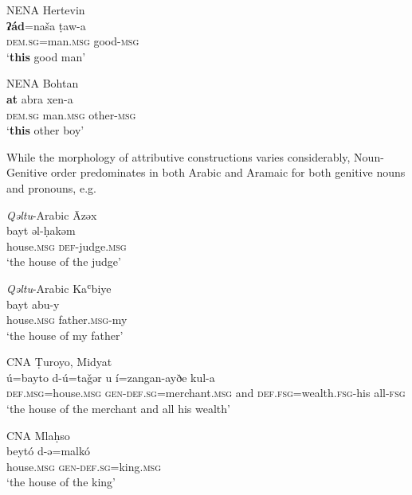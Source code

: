 \documentclass[output=paper,colorlinks,citecolor=brown,draftmode]{langscibook}
\begin{document}
\ea\label{Arabic:ex:8}
NENA Hertevin \citep{Jastrow1988NAHertevin}\\
\gll \textbf{ʔád}=naša ṭaw-a \\
     \textsc{dem.sg=}man\textsc{.msg} good\textsc{-msg} \\
\glt `\textbf{this} good man' 
\z

\ea\label{Arabic:ex:9}
NENA Bohtan \citep[122.§87]{Fox2009NABohtan}\\
\gll \textbf{at} abra xen-a \\
     \textsc{dem.sg} man\textsc{.msg} other\textsc{-msg} \\
\glt `\textbf{this} other boy'
\z


While the morphology of attributive constructions varies considerably, Noun-Genitive order predominates in both Arabic and Aramaic for both genitive nouns and pronouns, e.g. 

\ea\label{Arabic:ex:10}
\textit{Qəltu}-Arabic Āzəx \citep[VI6:§40]{Jastrow1981MAqetlu2} \\
\gll bayt əl-ḥakəm \\
     house\textsc{.msg} \textsc{def-}judge\textsc{.msg} \\
\glt `the house of the judge'
\z

\ea\label{Arabic:ex:11}
\textit{Qəltu}-Arabic Kaʿbiye \citep[IV:§16]{Jastrow2022CADiyarbakir}\\
\gll bayt abu-y \\
     house\textsc{.msg} father\textsc{.msg-}my \\
\glt `the house of my father' 
\z

\ea\label{Arabic:ex:12}
CNA Ṭuroyo, Midyat \citep[24:§55]{Ritter1967Turoyo} \\
\gll ú=bayto d-ú=taǧər u í=zangan-ayðe kul-a \\
     \textsc{def.msg=}house\textsc{.msg} \textsc{gen-def.sg=}merchant\textsc{.msg} and \textsc{def.fsg=}wealth\textsc{.fsg-}his all\textsc{-fsg} \\
\glt `the house of the merchant and all his wealth' 
\z

\ea\label{Arabic:ex:13}
CNA Mlaḥso \citep[126.§126]{Jastrow1994Mlahso}\\
\gll beytó d-ə=malkó  \\
     house\textsc{.msg} \textsc{gen-def.sg=}king\textsc{.msg} \\
\glt `the house of the king'
\z
\end{document}
